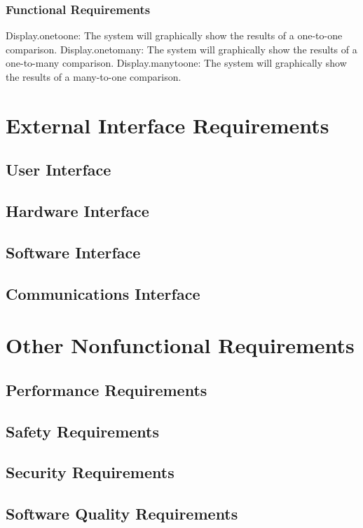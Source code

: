 \documentclass{article}
\begin{document}
\subsubsection{Functional Requirements}

Display.onetoone: The system will graphically show the results of a one-to-one comparison.
Display.onetomany: The system will graphically show the results of a one-to-many comparison.
Display.manytoone: The system will graphically show the results of a many-to-one comparison.


\section{External Interface Requirements}
\subsection{User Interface}
\subsection{Hardware Interface}
\subsection{Software Interface}
\subsection{Communications Interface}

\section{Other Nonfunctional Requirements}
\subsection{Performance Requirements}
\subsection{Safety Requirements}
\subsection{Security Requirements}
\subsection{Software Quality Requirements}
\end{document}
